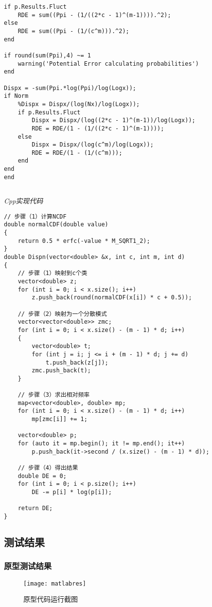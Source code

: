 \documentclass[cs4size,a4paper]{ctexart}
\begin{document}
\begin{lstlisting}
if p.Results.Fluct
	RDE = sum((Ppi - (1/((2*c - 1)^(m-1)))).^2);
else
	RDE = sum((Ppi - (1/(c^m))).^2);
end

if round(sum(Ppi),4) ~= 1
	warning('Potential Error calculating probabilities')
end

Dispx = -sum(Ppi.*log(Ppi)/log(Logx));
if Norm
	%Dispx = Dispx/(log(Nx)/log(Logx));
	if p.Results.Fluct
		Dispx = Dispx/(log((2*c - 1)^(m-1))/log(Logx));
		RDE = RDE/(1 - (1/((2*c - 1)^(m-1))));
	else
		Dispx = Dispx/(log(c^m)/log(Logx));
		RDE = RDE/(1 - (1/(c^m)));
	end
end
end
	
\end{lstlisting}


\emph{Cpp实现代码}
\begin{lstlisting}
// 步骤（1）计算NCDF
double normalCDF(double value)
{
	return 0.5 * erfc(-value * M_SQRT1_2);
}
double Dispn(vector<double> &x, int c, int m, int d)
{
	// 步骤（1）映射到c个类
	vector<double> z;
	for (int i = 0; i < x.size(); i++)
		z.push_back(round(normalCDF(x[i]) * c + 0.5));

	// 步骤（2）映射为一个分散模式
	vector<vector<double>> zmc;
	for (int i = 0; i < x.size() - (m - 1) * d; i++)
	{
		vector<double> t;
		for (int j = i; j <= i + (m - 1) * d; j += d)
			t.push_back(z[j]);
		zmc.push_back(t);
	}

	// 步骤（3）求出相对频率
	map<vector<double>, double> mp;
	for (int i = 0; i < x.size() - (m - 1) * d; i++)
		mp[zmc[i]] += 1;

	vector<double> p;
	for (auto it = mp.begin(); it != mp.end(); it++)
		p.push_back(it->second / (x.size() - (m - 1) * d));

	// 步骤（4）得出结果
	double DE = 0;
	for (int i = 0; i < p.size(); i++)
		DE -= p[i] * log(p[i]);

	return DE;
}
\end{lstlisting}

\subsection{测试结果}
\subsubsection{原型测试结果}
\begin{figure}[H]
	\small
	\centering
	\texttt{[image: matlabres]}
	\caption{原型代码运行截图}
\end{figure}
\end{document}
